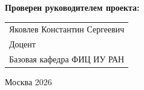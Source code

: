 \begin{titlepage}
\vspace{1em}
{\bf Проверен руководителем проекта: \vspace{2mm}}

{
\begin{tabular}{l}
Яковлев Константин Сергеевич\\
Доцент\\
Базовая кафедра ФИЦ ИУ РАН 
\end{tabular}}





\vspace{\fill}

\begin{center}
Москва 2026
\end{center}

\end{titlepage}